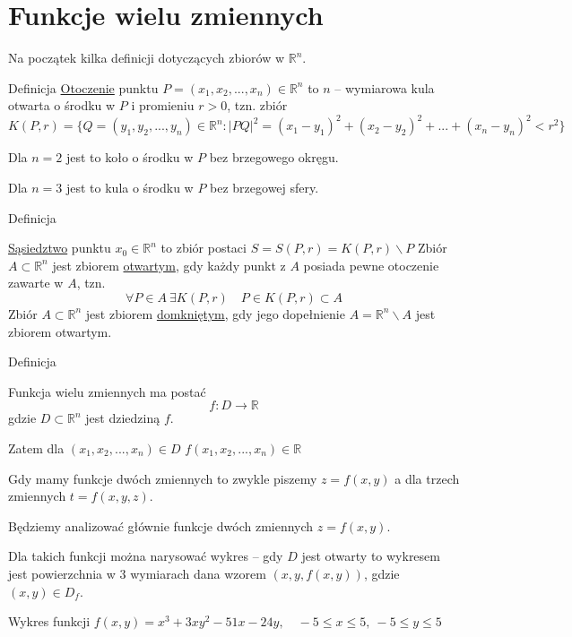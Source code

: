 \section{Funkcje wielu zmiennych}

Na początek kilka definicji dotyczących zbiorów w $ \mathbb{R}^n $.

\begin{tw}{Definicja}
    \underline{Otoczenie} punktu $ P = (x_1, x_2, ..., x_n) \in \mathbb{R}^n $ to $n$ -- wymiarowa kula otwarta o środku
    w $P$ i promieniu $r > 0$, tzn. zbiór
    \[ K(P, r) = \{ Q = (y_1, y_2, ..., y_n) \in \mathbb{R}^n : |PQ|^2 = (x_1 - y_1)^2 + (x_2 - y_2)^2 + ... + (x_n - y_n)^2 < r^2 \} \]
    
    Dla $n=2$ jest to koło o środku w $P$ bez brzegowego okręgu.
    
    Dla $n=3$ jest to kula o środku w $P$ bez brzegowej sfery.
\end{tw}
\begin{tw}{Definicja}
    
\underline{Sąsiedztwo} punktu $x_0 \in \mathbb{R}^n$ to zbiór postaci $ S = S(P, r) = K(P,r) \backslash P $
    Zbiór $ A \subset \mathbb{R}^n $ jest zbiorem \underline{otwartym}, gdy każdy punkt z $A$ posiada pewne otoczenie zawarte w $A$, tzn.
    \[ \forall P \!\in\! A \ \exists K(P, r) \quad P\in K(P,r) \subset A \]
    Zbiór $ A \subset \mathbb{R}^n $ jest zbiorem \underline{domkniętym}, gdy jego dopełnienie $ A = \mathbb{R}^n \backslash A $ jest zbiorem otwartym.
\end{tw}

\begin{tw}{Definicja}

Funkcja wielu zmiennych ma postać
$$ f: D \to \mathbb{R} $$
gdzie $ D \subset \mathbb{R}^n $ jest dziedziną $f$.

Zatem dla $ (x_1, x_2, ..., x_n) \in D $ \quad $ f(x_1, x_2, ..., x_n) \in \mathbb{R} $
\end{tw}

Gdy mamy funkcje dwóch zmiennych to zwykle piszemy $ z = f(x, y) $ a dla trzech zmiennych $ t = f(x, y, z) $.

Będziemy analizować głównie funkcje dwóch zmiennych $ z = f(x, y) $.

Dla takich funkcji można narysować wykres -- gdy $D$ jest otwarty to wykresem jest powierzchnia w $3$ wymiarach dana wzorem
$ (x, y, f(x,y)) $, gdzie $ (x,y) \in D_f $.

\begin{center}

Wykres funkcji $ f(x,y) = x^3 + 3xy^2 - 51x - 24y, \quad -5 \leq x \leq 5, \ -5 \leq y \leq 5 $
\end{center}

